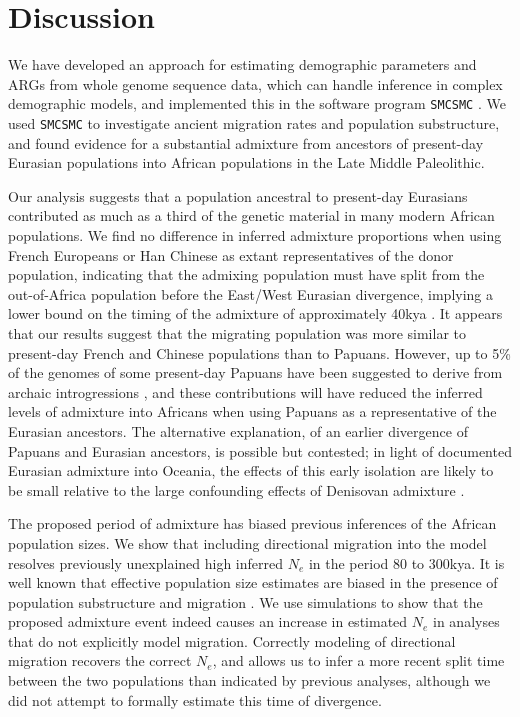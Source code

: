 \section{Discussion}
We have developed an approach for estimating demographic parameters and ARGs from whole genome sequence data, which can handle inference in complex demographic models, and implemented this in the software program {\tt SMCSMC} \cite{Henderson2018}. We used {\tt SMCSMC} to investigate ancient migration rates and population substructure, and found evidence for a substantial admixture from ancestors of present-day Eurasian populations into African populations in the Late Middle Paleolithic.

Our analysis suggests that a population ancestral to present-day Eurasians contributed as much as a third of the genetic material in many modern African populations. We find no difference in inferred admixture proportions when using French Europeans or Han Chinese as extant representatives of the donor population, indicating that the admixing population must have split from the out-of-Africa population before the East/West Eurasian divergence, implying a lower bound on the timing of the admixture of approximately 40kya \cite{Mathieson2014}. It appears that our results suggest that the migrating population was more similar to present-day French and Chinese populations than to Papuans.  However, up to 5\% of the genomes of some present-day Papuans have been suggested to derive from archaic introgressions \cite{Sankararaman2016}, and these contributions will have reduced the inferred levels of admixture into Africans when using Papuans as a representative of the Eurasian ancestors.
The alternative explanation, of an earlier divergence of Papuans and Eurasian ancestors, is possible but contested; in light of documented Eurasian admixture into Oceania, the effects of this early isolation are likely to be small relative to the large confounding effects of Denisovan admixture \cite{Malaspinas2016, Nielsen2017a}.

The proposed period of admixture has biased previous inferences of the African population sizes. We show that including directional migration into the model resolves previously unexplained high inferred $N_e$ in the period $80$ to $300$kya. It is well known that effective population size estimates are biased in the presence of population substructure and migration \cite{Chikhi2018, Li2011}. We use simulations to show that the proposed admixture event indeed causes an increase in estimated $N_e$ in analyses that do not explicitly model migration.  Correctly modeling of directional migration recovers the correct $N_e$, and allows us to infer a more recent split time between the two populations than indicated by previous analyses, although we did not attempt to formally estimate this time of divergence.

